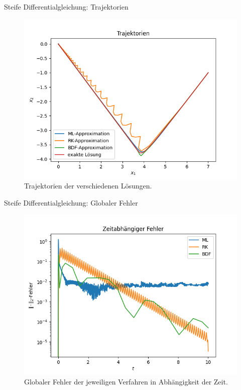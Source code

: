 \begin{frame}{Steife Differentialgleichung: Trajektorien}
    \begin{figure}
        \centering
        \includegraphics[scale=0.5]{images/Stiff_plots/stifftrajectories_}
        \caption{Trajektorien der verschiedenen Lösungen.}
        \label{fig:stiff-trajectories}
    \end{figure}
\end{frame}

\begin{frame}{Steife Differentialgleichung: Globaler Fehler}
    \begin{figure}
        \centering
        \includegraphics[scale=0.5]{images/Stiff_plots/stiffError_in_time}
        \caption{Globaler Fehler  der jeweiligen Verfahren in Abhängigkeit der Zeit.}
        \label{fig:stiff-error-in-time}
    \end{figure}
\end{frame}

